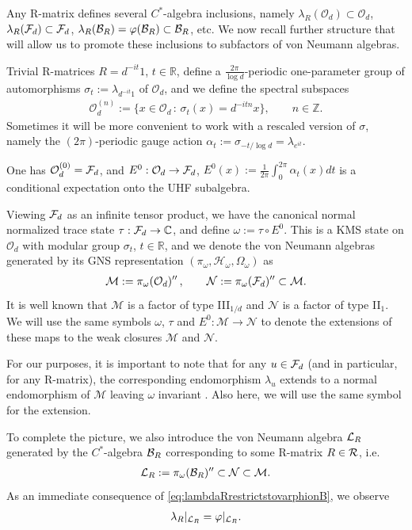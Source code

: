 \documentclass[12pt,a4paper]{amsart}
\numberwithin{equation}{section}
\theoremstyle{remark}
\newcommand{\Cl}{\mathbb{C}}
\newcommand{\Rl}{\mathbb{R}}
\newcommand{\Zl}{\mathbb{Z}}
\newcommand{\Hil}{\mathcal{H}}
\newcommand{\Om}{\Omega}
\newcommand{\om}{\omega}
\newcommand{\la}{\lambda}
\newcommand{\CM}[0]{\mathcal{M}} \newcommand{\CN}[0]{\mathcal{N}}
\newcommand{\CO}[0]{\mathcal{O}} \newcommand{\CP}[0]{\mathcal{P}}
\begin{document}
Any R-matrix defines several $C^*$-algebra inclusions, namely $\la_R(\CO_d)\subset\CO_d$, $\la_R(\CF_d)\subset\CF_d$, $\la_R(\CB_R)=\varphi(\CB_R)\subset\CB_R$, etc. We now recall further structure that will allow us to promote these inclusions to subfactors of von Neumann algebras.


Trivial R-matrices $R=d^{-it}1$, $t\in\Rl$, define a $\frac{2\pi}{\log d}$-periodic one-parameter group of automorphisms $\sigma_t:=\la_{d^{-it}1}$ of $\CO_d$, and we define the spectral subspaces 
\begin{align}\label{eq:SpectralSubspaces}
 \CO_d^{(n)}:=\{x\in\CO_d\,:\,\sigma_t(x)=d^{-itn}x\},\qquad n\in\Zl.
\end{align}
Sometimes it will be more convenient to work with a rescaled version of $\sigma$, namely the $(2\pi)$-periodic gauge action $\alpha_t:=\sigma_{-t/\log d}=\la_{e^{it}}$.

One has $\CO_d^{(0)}=\CF_d$, and $E^0:\CO_d\to\CF_d$, $E^0(x):=\frac{1}{2\pi}\int_0^{2\pi}\alpha_t(x)dt$ is a conditional expectation onto the UHF subalgebra.

Viewing $\mathcal{F}_d$ as an infinite tensor product, we have the canonical normal normalized trace state $\tau:\CF_d\to\Cl$, and define $\om:=\tau\circ E^0$. This is a KMS state on $\CO_d$ with modular group $\sigma_t$, $t\in\Rl$, and we denote the von Neumann algebras generated by its GNS representation $(\pi_\om,\Hil_\om,\Om_\om)$ as
\begin{align}
  \CM:=\pi_\om(\CO_d)''\,,\qquad 
  \CN:=\pi_\om(\CF_d)''\subset\CM. 
\end{align}
It is well known that $\CM$ is a factor of type III$_{1/d}$ and $\CN$ is a factor of type II$_1$. We will use the same symbols $\om$, $\tau$ and $E^0:\CM\to\CN$ \cite{Haagerup:1989} to denote the extensions of these maps to the weak closures $\CM$ and $\CN$. 

For our purposes, it is important to note that for any $u\in\mathcal{F}_d$ (and in particular, for any R-matrix), the corresponding endomorphism $\la_u$ extends to a normal endomorphism of $\CM$ leaving $\om$ invariant \cite{Longo:1994_2}. Also here, we will use the same symbol for the extension. 

To complete the picture, we also introduce the von Neumann algebra $\mathcal{L}_R$ generated by the $C^*$-algebra $\mathcal{B}_R$ corresponding to some R-matrix $R\in\mathcal{R}$, i.e. 
\begin{align}
 \CL_R:=\pi_\om(\CB_R)''\subset\CN\subset\CM.
\end{align}
As an immediate consequence of \eqref{eq:lambdaRrestrictstovarphionB}, we observe 
\begin{align}
	\la_R|_{\CL_R} = \varphi|_{\CL_R}.
\end{align}
\end{document}

